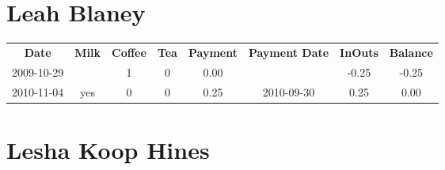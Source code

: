 \section{Leah Blaney}

\begin{center}
\begin{tabular}{cccccccc}
\textbf{Date} & \textbf{Milk} & \textbf{Coffee} & \textbf{Tea} & \textbf{Payment} & \textbf{Payment Date} & \textbf{InOuts} & \textbf{Balance} \\
2009-10-29 &  & 1 & 0 & 0.00 &  & -0.25 & -0.25\\ 
2010-11-04 & yes & 0 & 0 & 0.25 & 2010-09-30 &  0.25 &  0.00
\end{tabular}
\end{center}

\section{Lesha Koop Hines}

